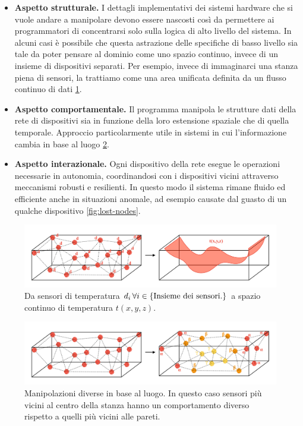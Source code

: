 \documentclass[12pt,a4paper,openright,twoside]{book}
\begin{document}
\begin{itemize}
    \item \textbf{Aspetto strutturale.} I dettagli implementativi dei sistemi hardware che si vuole andare a manipolare devono essere nascosti così da permettere ai programmatori di concentrarsi solo sulla logica di alto livello del sistema. In alcuni casi è possibile che questa astrazione delle specifiche di basso livello sia tale da poter pensare al dominio come uno spazio continuo, invece di un insieme di dispositivi separati. Per esempio, invece di immaginarci una stanza piena di sensori, la trattiamo come una area unificata definita da un flusso continuo di dati \cref{fig:points-to-linear}.
    \item \textbf{Aspetto comportamentale.} Il programma manipola le strutture dati della rete di dispositivi sia in funzione della loro estensione spaziale che di quella temporale. Approccio particolarmente utile in sistemi in cui l'informazione cambia in base al luogo \cref{fig:different-function}.
    \item \textbf{Aspetto interazionale.} Ogni dispositivo della rete esegue le operazioni necessarie in autonomia, coordinandosi con i dispositivi vicini attraverso meccanismi robusti e resilienti. In questo modo il sistema rimane fluido ed efficiente anche in situazioni anomale, ad esempio causate dal guasto di un qualche dispositivo \cref{fig:lost-nodes}.
\end{itemize}

\begin{figure}
    \centering
    \includegraphics[width=.9\linewidth]{figures/points-to-gradient.pdf}
    \caption{Da sensori di temperatura $d_i \thinspace \forall i \in {\text{\{Insieme dei sensori.\}}}$ a spazio continuo di temperatura $t(x,y,z)$.}
    \label{fig:points-to-linear}
\end{figure}

\begin{figure}
    \centering
    \includegraphics[width=.9\linewidth]{figures/different-function.pdf}
    \caption{Manipolazioni diverse in base al luogo. In questo caso sensori più vicini al centro della stanza hanno un comportamento diverso rispetto a quelli più vicini alle pareti.}
    \label{fig:different-function}
\end{figure}
\end{document}
